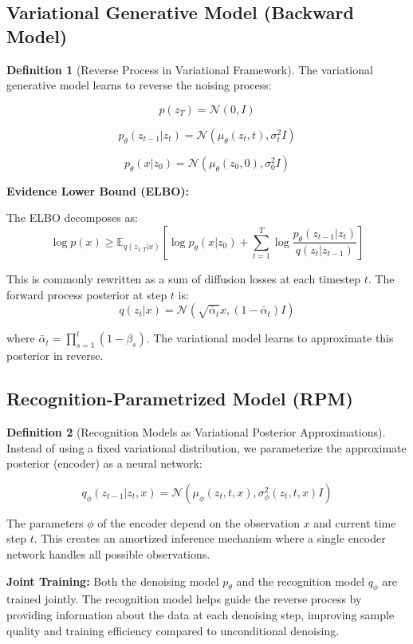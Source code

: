 \documentclass[12pt,a4paper]{article}
\theoremstyle{definition}
\newtheorem{definition}{Definition}[section]
\begin{document}
\subsection{Variational Generative Model (Backward Model)}

\begin{definition}[Reverse Process in Variational Framework]
The variational generative model learns to reverse the noising process:

\[
p(z_T) = \mathcal{N}(0, I)
\]

\[
p_\theta(z_{t-1} | z_t) = \mathcal{N}(\mu_\theta(z_t, t), \sigma_t^2 I)
\]

\[
p_\theta(x | z_0) = \mathcal{N}(\mu_\theta(z_0, 0), \sigma_0^2 I)
\]

\textbf{Evidence Lower Bound (ELBO):}

The ELBO decomposes as:
\[
\log p(x) \geq \mathbb{E}_{q(z_{1:T}|x)} \left[ \log p_\theta(x|z_0) + \sum_{t=1}^T \log \frac{p_\theta(z_{t-1}|z_t)}{q(z_t|z_{t-1})} \right]
\]

This is commonly rewritten as a sum of diffusion losses at each timestep $t$. The forward process posterior at step $t$ is:
\[
q(z_t | x) = \mathcal{N}(\sqrt{\bar{\alpha}_t} x, (1-\bar{\alpha}_t) I)
\]

where $\bar{\alpha}_t = \prod_{s=1}^t (1 - \beta_s)$. The variational model learns to approximate this posterior in reverse.
\end{definition}

\subsection{Recognition-Parametrized Model (RPM)}

\begin{definition}[Recognition Models as Variational Posterior Approximations]
Instead of using a fixed variational distribution, we parameterize the approximate posterior (encoder) as a neural network:

\[
q_\phi(z_{t-1} | z_t, x) = \mathcal{N}(\mu_\phi(z_t, t, x), \sigma_\phi^2(z_t, t, x) I)
\]

The parameters $\phi$ of the encoder depend on the observation $x$ and current time step $t$. This creates an amortized inference mechanism where a single encoder network handles all possible observations.

\textbf{Joint Training:}
Both the denoising model $p_\theta$ and the recognition model $q_\phi$ are trained jointly. The recognition model helps guide the reverse process by providing information about the data at each denoising step, improving sample quality and training efficiency compared to unconditional denoising.
\end{definition}
\end{document}
